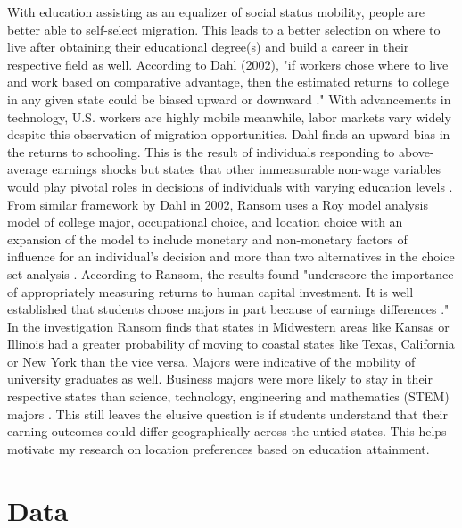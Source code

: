 \documentclass[12pt, English]{article}
\begin{document}
With education assisting as an equalizer of social status mobility, people are better able to self-select migration. This leads to a better selection on where to live after obtaining their educational degree(s) and build a career in their respective field as well. According to Dahl (2002), "if workers chose where to live and work based on comparative advantage, then the estimated returns to college in any given state could be biased upward or downward \citep{dahl2002mobility}." With advancements in technology, U.S. workers are highly mobile meanwhile, labor markets vary widely despite this observation of migration opportunities. Dahl finds an upward bias in the returns to schooling. This is the result of individuals responding to above-average earnings shocks but states that other immeasurable non-wage variables would play pivotal roles in decisions of individuals with varying education levels \citep{dahl2002mobility}. From similar framework by Dahl in 2002, Ransom uses a Roy model analysis model of college major, occupational choice, and location choice with an expansion of the model to include monetary and non-monetary factors of influence for an individual’s decision and more than two alternatives in the choice set analysis \citep{ransom2020selective}. According to Ransom, the results found "underscore the importance of appropriately measuring returns to human capital investment. It is well established that students choose majors in part because of earnings differences \citep{ransom2020selective}." In the investigation Ransom finds that states in Midwestern areas like Kansas or Illinois had a greater probability of moving to coastal states like Texas, California or New York than the vice versa. Majors were indicative of the mobility of university graduates as well. Business majors were more likely to stay in their respective states than science, technology, engineering and mathematics (STEM) majors \citep{ransom2020selective}. This still leaves the elusive question is if students understand that their earning outcomes could differ geographically across the untied states. This helps motivate my research on location preferences based on education attainment. 

\section{Data}
\end{document}

